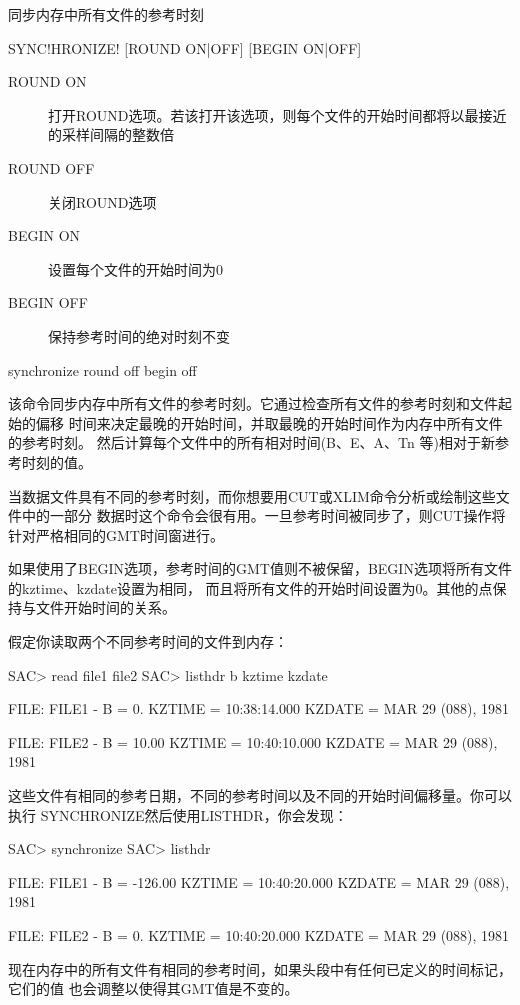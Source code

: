 \label{cmd:synchronize}

同步内存中所有文件的参考时刻

\begin{SACSTX}
SYNC!HRONIZE! [ROUND ON|OFF] [BEGIN ON|OFF]
\end{SACSTX}

\begin{description}
\item [ROUND ON] 打开ROUND选项。若该打开该选项，则每个文件的开始时间都将以最接近的采样间隔的整数倍
\item [ROUND OFF] 关闭ROUND选项
\item [BEGIN ON] 设置每个文件的开始时间为0
\item [BEGIN OFF] 保持参考时间的绝对时刻不变
\end{description}

\begin{SACDFT}
synchronize round off begin off
\end{SACDFT}

该命令同步内存中所有文件的参考时刻。它通过检查所有文件的参考时刻和文件起始的偏移
时间来决定最晚的开始时间，并取最晚的开始时间作为内存中所有文件的参考时刻。
然后计算每个文件中的所有相对时间(B、E、A、Tn 等)相对于新参考时刻的值。

当数据文件具有不同的参考时刻，而你想要用CUT或XLIM命令分析或绘制这些文件中的一部分
数据时这个命令会很有用。一旦参考时间被同步了，则CUT操作将针对严格相同的GMT时间窗进行。

如果使用了BEGIN选项，参考时间的GMT值则不被保留，BEGIN选项将所有文件的kztime、kzdate设置为相同，
而且将所有文件的开始时间设置为0。其他的点保持与文件开始时间的关系。

假定你读取两个不同参考时间的文件到内存：
\begin{SACCode}
SAC> read file1 file2
SAC> listhdr b kztime kzdate

  FILE: FILE1
  -
  B = 0.
  KZTIME = 10:38:14.000
  KZDATE = MAR 29 (088), 1981

  FILE: FILE2
  -
  B = 10.00
  KZTIME = 10:40:10.000
  KZDATE = MAR 29 (088), 1981
\end{SACCode}

这些文件有相同的参考日期，不同的参考时间以及不同的开始时间偏移量。你可以执行
SYNCHRONIZE然后使用LISTHDR，你会发现：
\begin{SACCode}
SAC> synchronize
SAC> listhdr

  FILE: FILE1
  -
  B = -126.00
  KZTIME = 10:40:20.000
  KZDATE = MAR 29 (088), 1981

  FILE: FILE2
  -
  B = 0.
  KZTIME = 10:40:20.000
  KZDATE = MAR 29 (088), 1981
\end{SACCode}
现在内存中的所有文件有相同的参考时间，如果头段中有任何已定义的时间标记，它们的值
也会调整以使得其GMT值是不变的。
